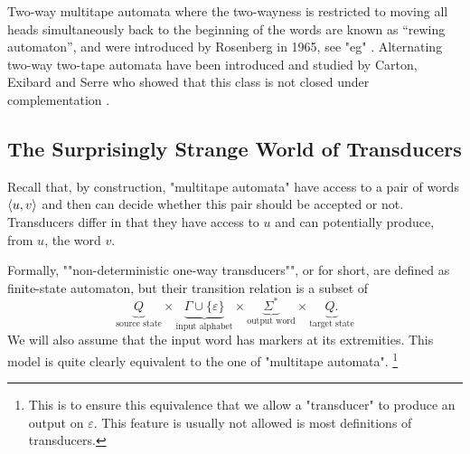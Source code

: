 Two-way multitape automata where the two-wayness is restricted to
moving all heads simultaneously back to the beginning of the words 
are known as ``rewing automaton'', and were introduced by Rosenberg in 1965,
see "eg" \cite[\S~4]{Chan1980ReversalBoundedComputations}.
Alternating two-way two-tape automata have been introduced
and studied by Carton, Exibard and Serre who
showed that this class is not closed under complementation
\cite[Theorem~1]{CartonExibardSerre2017TwoWayTwoTapeAutomata}.

\subsection{The Surprisingly Strange World of Transducers}
\label{sec:prelim-transductions}

Recall that, by construction, "multitape automata" have access to
a pair of words $\langle u,v\rangle$ and then can decide whether 
this pair should be accepted or not. 
Transducers differ in that they have access to $u$ and
can potentially produce, from $u$, the word $v$.

Formally, \AP""non-deterministic one-way transducers"",
or  for short, are defined as finite-state automaton, but
their transition relation is a subset of
\[
	\underbrace{Q}_{\text{source state}}
	\times \underbrace{\Gamma \cup \{\varepsilon\}}_{\text{input alphabet}}
	\times \underbrace{\Sigma^*}_{\text{output word}}
	\times \underbrace{Q.\!}_{\text{target state}}
\]
We will also assume that the input word has markers at its extremities.
This model is quite clearly equivalent to the one of "multitape automata".%
\footnote{This is to ensure this equivalence that we allow
a "transducer" to produce an output on $\varepsilon$.
This feature is usually not allowed is most definitions of transducers.}

